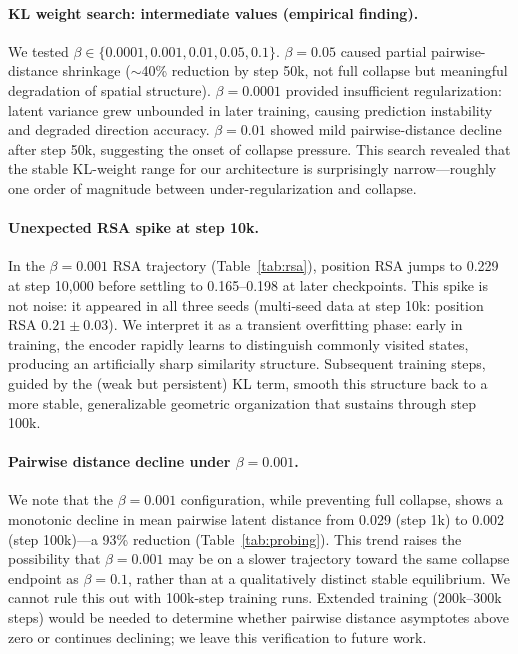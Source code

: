 \documentclass{article}
\begin{document}
\paragraph{KL weight search: intermediate values (empirical finding).}
We tested $\beta \in \{0.0001, 0.001, 0.01, 0.05, 0.1\}$.
$\beta=0.05$ caused partial pairwise-distance shrinkage
($\sim$40\% reduction by step 50k, not full collapse but meaningful
degradation of spatial structure).
$\beta=0.0001$ provided insufficient regularization: latent variance
grew unbounded in later training, causing prediction instability
and degraded direction accuracy.
$\beta=0.01$ showed mild pairwise-distance decline after step 50k,
suggesting the onset of collapse pressure.
This search revealed that the stable KL-weight range for our
architecture is surprisingly narrow---roughly one order of magnitude
between under-regularization and collapse.

\paragraph{Unexpected RSA spike at step 10k.}
In the $\beta=0.001$ RSA trajectory (Table~\ref{tab:rsa}),
position RSA jumps to 0.229 at step 10{,}000 before settling to
0.165--0.198 at later checkpoints.
This spike is not noise: it appeared in all three seeds
(multi-seed data at step 10k: position RSA $0.21\pm0.03$).
We interpret it as a transient overfitting phase: early in training,
the encoder rapidly learns to distinguish commonly visited states,
producing an artificially sharp similarity structure.
Subsequent training steps, guided by the (weak but persistent) KL
term, smooth this structure back to a more stable, generalizable
geometric organization that sustains through step 100k.

\paragraph{Pairwise distance decline under $\beta=0.001$.}
We note that the $\beta=0.001$ configuration, while preventing full
collapse, shows a monotonic decline in mean pairwise latent distance
from 0.029 (step 1k) to 0.002 (step 100k)---a 93\% reduction
(Table~\ref{tab:probing}).
This trend raises the possibility that $\beta=0.001$ may be on a slower
trajectory toward the same collapse endpoint as $\beta=0.1$, rather than
at a qualitatively distinct stable equilibrium.
We cannot rule this out with 100k-step training runs.
Extended training (200k--300k steps) would be needed to determine
whether pairwise distance asymptotes above zero or continues declining;
we leave this verification to future work.
\end{document}
